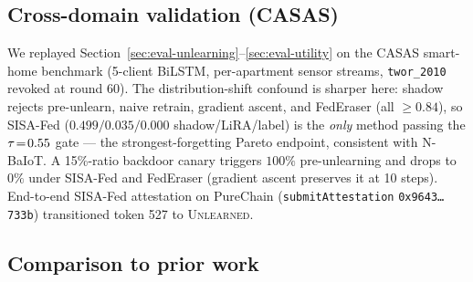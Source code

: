 \subsection{Cross-domain validation (CASAS)}
\label{sec:eval-casas}

We replayed Section~\ref{sec:eval-unlearning}--\ref{sec:eval-utility} on
the CASAS smart-home benchmark (5-client BiLSTM, per-apartment
sensor streams, \texttt{twor\_2010} revoked at round 60). The
distribution-shift confound is sharper here: shadow rejects
pre-unlearn, naive retrain, gradient ascent, and FedEraser (all
$\ge\!0.84$), so SISA-Fed ($0.499/0.035/0.000$ shadow/LiRA/label)
is the \emph{only} method passing the $\tau\!=\!0.55$ gate ---
the strongest-forgetting Pareto endpoint, consistent with N-BaIoT.
A 15\%-ratio backdoor canary triggers $100\%$ pre-unlearning and
drops to $0\%$ under SISA-Fed and FedEraser (gradient ascent
preserves it at 10 steps). End-to-end SISA-Fed attestation on
PureChain (\texttt{submitAttestation} \texttt{0x9643\ldots 733b})
transitioned token 527 to \textsc{Unlearned}.

\subsection{Comparison to prior work}
\label{sec:eval-compare}


